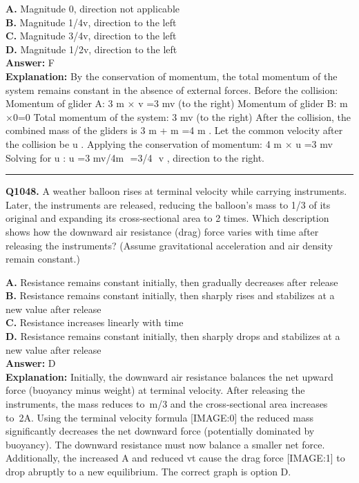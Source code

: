 \documentclass[12pt]{article}
\begin{document}
\textbf{A.} Magnitude 0, direction not applicable \\
\textbf{B.} Magnitude 1/4v, direction to the left \\
\textbf{C.} Magnitude 3/4v, direction to the left \\
\textbf{D.} Magnitude 1/2v, direction to the left \\

\textbf{Answer:} F \\
\textbf{Explanation:} By the conservation of momentum, the total momentum of the system remains constant in the absence of external forces. Before the collision:
Momentum of glider A: 3
m
×
v
=3
mv
(to the right)
Momentum of glider B:
m
×0=0
Total momentum of the system: 3
mv
(to the right)
After the collision, the combined mass of the gliders is 3
m
+
m
=4
m
. Let the common velocity after the collision be
u
. Applying the conservation of momentum:
4
m
×
u
=3
mv
Solving for
u
:
u
=3
mv/4m
​
=3/4
​
v
, direction to the right.

\hrule
\vspace{1em}


\noindent
\textbf{Q1048.} A weather balloon rises at terminal velocity while carrying instruments. Later, the instruments are released, reducing the balloon’s mass to 1/3 of its original and expanding its cross-sectional area to 2 times. Which description shows how the downward air resistance (drag) force varies with time after releasing the instruments? (Assume gravitational acceleration and air density remain constant.)



\textbf{A.} Resistance remains constant initially, then gradually decreases after release \\
\textbf{B.} Resistance remains constant initially, then sharply rises and stabilizes at a new value after release \\
\textbf{C.} Resistance increases linearly with time \\
\textbf{D.} Resistance remains constant initially, then sharply drops and stabilizes at a new value after release \\

\textbf{Answer:} D \\
\textbf{Explanation:} Initially, the downward air resistance balances the net upward force (buoyancy minus weight) at terminal velocity. After releasing the instruments, the mass reduces to m/3
and the cross-sectional area increases to 2A. Using the terminal velocity formula
[IMAGE:0]
the reduced mass significantly decreases the net downward force (potentially dominated by buoyancy). The downward resistance must now balance a smaller net force. Additionally, the increased A and reduced vt cause the drag force
[IMAGE:1]
to drop abruptly to a new equilibrium. The correct graph is option D.
\end{document}
